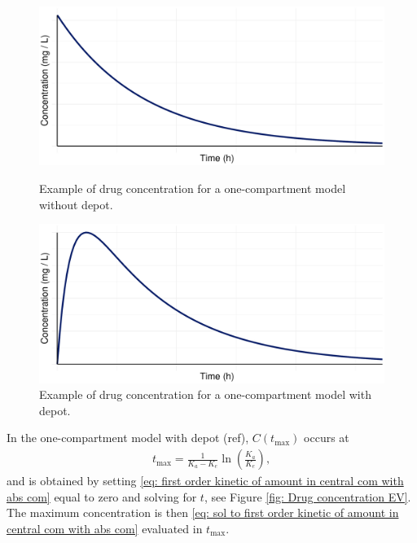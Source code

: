 \begin{figure}[H]
    \centering
    \begin{minipage}{0.45\textwidth}
        \centering
        \includegraphics[width=\linewidth]{fig/img/Exposure and Css/Concentration W. IV.pdf}
        \caption{Example of drug concentration for a one-compartment model without depot.}
        \label{fig: Drug Concentration IV}
    \end{minipage}%
    \hfill
    \begin{minipage}{0.45\textwidth}
        \centering
        \includegraphics[width=\linewidth]{fig/img/Exposure and Css/Concentration W. Oral.pdf}
        \caption{Example of drug concentration for a one-compartment model with depot.}
        \label{fig: Drug concentration EV}
    \end{minipage}
    \label{fig: Drug concentrations}
\end{figure}

In the one-compartment model with depot (ref), $C(t_{\text{max}})$ occurs at
\begin{align} \label{eq: t_max for one com with absorption}
    t_{\text{max}} = \frac{1}{K_a - K_e} \ln\left(\frac{K_a}{K_e}\right),
\end{align}
and is obtained by setting \eqref{eq: first order kinetic of amount in central com with abs com} equal to zero and solving for $t$, see Figure \ref{fig: Drug concentration EV}. The maximum concentration is then \eqref{eq: sol to first order kinetic of amount in central com with abs com} evaluated in $t_{\text{max}}$.


